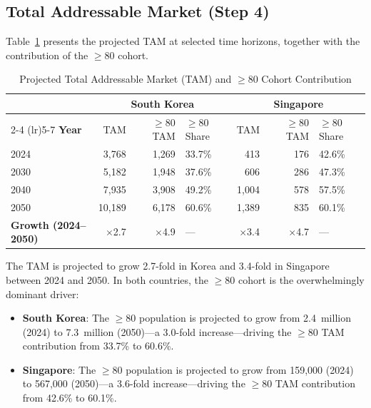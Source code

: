 \documentclass[12pt, a4paper]{article}
\begin{document}
\subsection{Total Addressable Market (Step 4)}

Table~\ref{tab:tam} presents the projected TAM at selected time horizons, together with the contribution of the $\geq$80 cohort.

\begin{table}[H]
\centering
\caption{Projected Total Addressable Market (TAM) and $\geq$80 Cohort Contribution}
\label{tab:tam}
\smallskip
\begin{tabular}{@{}l rrl rrl@{}}
\toprule
& \multicolumn{3}{c}{\textbf{South Korea}} & \multicolumn{3}{c}{\textbf{Singapore}} \\
\cmidrule(lr){2-4} \cmidrule(lr){5-7}
\textbf{Year} & TAM & $\geq$80 TAM & $\geq$80 Share & TAM & $\geq$80 TAM & $\geq$80 Share \\
\midrule
2024             & 3{,}768  & 1{,}269 & 33.7\% & 413   & 176 & 42.6\% \\
2030             & 5{,}182  & 1{,}948 & 37.6\% & 606   & 286 & 47.3\% \\
2040             & 7{,}935  & 3{,}908 & 49.2\% & 1{,}004 & 578 & 57.5\% \\
2050             & 10{,}189 & 6{,}178 & 60.6\% & 1{,}389 & 835 & 60.1\% \\
\midrule
\textbf{Growth (2024--2050)} & $\times$2.7 & $\times$4.9 & --- & $\times$3.4 & $\times$4.7 & --- \\
\bottomrule
\end{tabular}
\end{table}

The TAM is projected to grow 2.7-fold in Korea and 3.4-fold in Singapore between 2024 and 2050. In both countries, the $\geq$80 cohort is the overwhelmingly dominant driver:

\begin{itemize}[leftmargin=*, itemsep=4pt]
    \item \textbf{South Korea}: The $\geq$80 population is projected to grow from 2.4~million (2024) to 7.3~million (2050)---a 3.0-fold increase---driving the $\geq$80 TAM contribution from 33.7\% to 60.6\%.
    \item \textbf{Singapore}: The $\geq$80 population is projected to grow from 159{,}000 (2024) to 567{,}000 (2050)---a 3.6-fold increase---driving the $\geq$80 TAM contribution from 42.6\% to 60.1\%.
\end{itemize}
\end{document}
